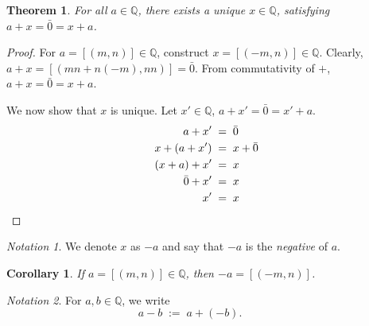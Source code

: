 \documentclass[10pt]{article}
\newtheorem{theorem}{Theorem}[section]
\newtheorem{corollary}{Corollary}[theorem]
\theoremstyle{definition}
\theoremstyle{remark}
\newtheorem*{notation}{Notation}
\newcommand{\Q}{\mathbb{Q}}
\begin{document}
        \begin{theorem}
                        For all $a \in \Q$, there exists a unique $x \in \Q$, satisfying $a + x = \bar{0} = x + a$.
        \end{theorem}
        \begin{proof}
                For $a = [(m, n)] \in \Q$, construct $x = [(-m, n)] \in \Q$.
                Clearly, $a + x = [(mn + n(-m), nn)] = \bar{0}$.
                From commutativity of $+$, $a + x = \bar{0} = x + a$.

                We now show that $x$ is unique. Let $x' \in \Q$, $a + x' = \bar{0} = x' + a$.
                \begin{align*}
                        a + x' \;&=\; \bar{0} \\
                        x + (a + x') \;&=\; x + \bar{0} \\
                        (x + a) + x' \;&=\; x \\
                        \bar{0} + x' \;&=\; x \\
                        x' \;&=\; x     \qedhere
                \end{align*}
        \end{proof}
        \begin{notation}
                We denote $x$ as $-a$ and say that $-a$ is the \textit{negative} of $a$.
        \end{notation}
        \begin{corollary}
                If $a = [(m, n)] \in \Q$, then $-a = [(-m, n)]$.
        \end{corollary}
        \begin{notation}
                For $a, b \in \Q$, we write
                \[
                a - b \;:=\; a + (-b).\quad\quad\quad
                \]
        \end{notation}
\end{document}
